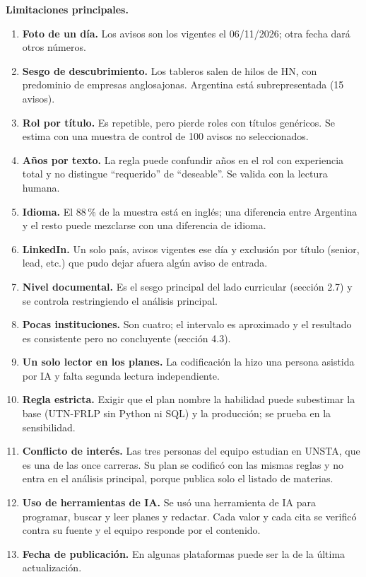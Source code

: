 \documentclass[11pt,a4paper]{article}
\begin{document}
\textbf{Limitaciones principales.}
\begin{enumerate}
\item \textbf{Foto de un día.} Los avisos son los vigentes el 06/11/2026; otra fecha dará otros números.
\item \textbf{Sesgo de descubrimiento.} Los tableros salen de hilos de HN, con predominio de empresas anglosajonas. Argentina está subrepresentada (15 avisos).
\item \textbf{Rol por título.} Es repetible, pero pierde roles con títulos genéricos. Se estima con una muestra de control de 100 avisos no seleccionados.
\item \textbf{Años por texto.} La regla puede confundir años en el rol con experiencia total y no distingue ``requerido'' de ``deseable''. Se valida con la lectura humana.
\item \textbf{Idioma.} El 88\,\% de la muestra está en inglés; una diferencia entre Argentina y el resto puede mezclarse con una diferencia de idioma.
\item \textbf{LinkedIn.} Un solo país, avisos vigentes ese día y exclusión por título (senior, lead, etc.) que pudo dejar afuera algún aviso de entrada.
\item \textbf{Nivel documental.} Es el sesgo principal del lado curricular (sección 2.7) y se controla restringiendo el análisis principal.
\item \textbf{Pocas instituciones.} Son cuatro; el intervalo es aproximado y el resultado es consistente pero no concluyente (sección 4.3).
\item \textbf{Un solo lector en los planes.} La codificación la hizo una persona asistida por IA y falta segunda lectura independiente.
\item \textbf{Regla estricta.} Exigir que el plan nombre la habilidad puede subestimar la base (UTN-FRLP sin Python ni SQL) y la producción; se prueba en la sensibilidad.
\item \textbf{Conflicto de interés.} Las tres personas del equipo estudian en UNSTA, que es una de las once carreras. Su plan se codificó con las mismas reglas y no entra en el análisis principal, porque publica solo el listado de materias.
\item \textbf{Uso de herramientas de IA.} Se usó una herramienta de IA para programar, buscar y leer planes y redactar. Cada valor y cada cita se verificó contra su fuente y el equipo responde por el contenido.
\item \textbf{Fecha de publicación.} En algunas plataformas puede ser la de la última actualización.
\end{enumerate}
\end{document}
